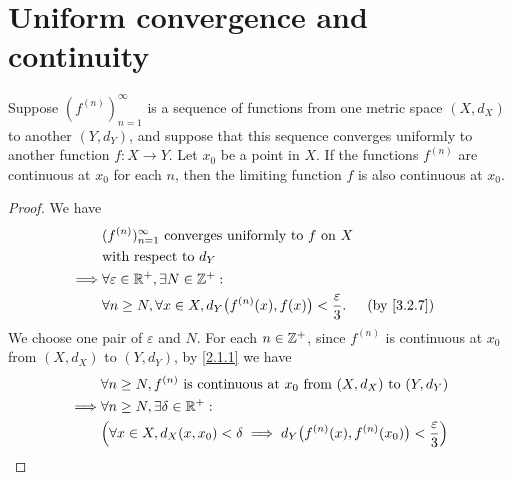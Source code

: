 \section{Uniform convergence and continuity}\label{sec:3.3}

\begin{thm}\label{3.3.1}
  Suppose \((f^{(n)})_{n = 1}^\infty\) is a sequence of functions from one metric space \((X, d_X)\) to another \((Y, d_Y)\), and suppose that this sequence converges uniformly to another function \(f : X \to Y\).
  Let \(x_0\) be a point in \(X\).
  If the functions \(f^{(n)}\) are continuous at \(x_0\) for each \(n\), then the limiting function \(f\) is also continuous at \(x_0\).
\end{thm}

\begin{proof}
  We have
  \begin{align*}
             & (f^{(n)})_{n = 1}^\infty \text{ converges uniformly to } f \text{ on } X                                   \\
             & \text{with respect to } d_Y                                                                                \\
    \implies & \forall \varepsilon \in \R^+, \exists N \in \Z^+ :                                                         \\
             & \forall n \geq N, \forall x \in X, d_Y\big(f^{(n)}(x), f(x)\big) < \dfrac{\varepsilon}{3}. &  & \by{3.2.7}
  \end{align*}
  We choose one pair of \(\varepsilon\) and \(N\).
  For each \(n \in \mathbb{Z}^+\), since \(f^{(n)}\) is continuous at \(x_0\) from \((X, d_X)\) to \((Y, d_Y)\), by \cref{2.1.1} we have
  \begin{align*}
             & \forall n \geq N, f^{(n)} \text{ is continuous at } x_0 \text{ from } (X, d_X) \text{ to } (Y, d_Y)                                                                                            \\
    \implies & \forall n \geq N, \exists \delta \in \R^+ :                                                                                                                                                    \\
             & \Big(\forall x \in X, d_X(x, x_0) < \delta \implies d_Y\big(f^{(n)}(x), f^{(n)}(x_0)\big) < \dfrac{\varepsilon}{3}\Big)                                                                        \\

\end{align*}
\end{proof}
